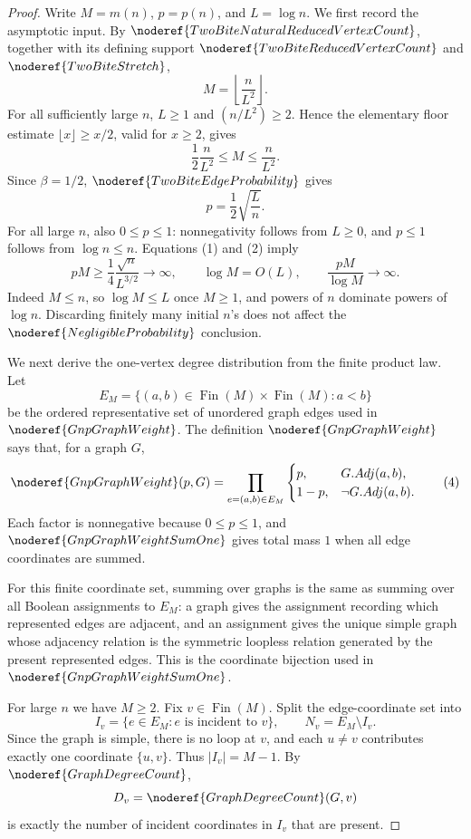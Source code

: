 \begin{proof}
Write \(M=m(n)\), \(p=p(n)\), and \(L=\log n\).  We first record the
asymptotic input.  By \(\noderef{TwoBiteNaturalReducedVertexCount}\),
together with its defining support \(\noderef{TwoBiteReducedVertexCount}\)
and \(\noderef{TwoBiteStretch}\),
\[
M=\left\lfloor \frac{n}{L^2}\right\rfloor .
\]
For all sufficiently large \(n\), \(L\ge1\) and
\((n/L^2)\ge2\).  Hence the elementary floor estimate
\(\lfloor x\rfloor\ge x/2\), valid for \(x\ge2\), gives
\[
\frac12\frac{n}{L^2}\le M\le \frac{n}{L^2}.
\tag{1}
\]
Since \(\beta=1/2\), \(\noderef{TwoBiteEdgeProbability}\) gives
\[
p=\frac12\sqrt{\frac{L}{n}}.
\tag{2}
\]
For all large \(n\), also \(0\le p\le1\): nonnegativity follows from
\(L\ge0\), and \(p\le1\) follows from \(\log n\le n\).  Equations (1) and
(2) imply
\[
pM\ge \frac14\frac{\sqrt n}{L^{3/2}}\to\infty,
\qquad
\log M=O(L),
\qquad
\frac{pM}{\log M}\to\infty .
\tag{3}
\]
Indeed \(M\le n\), so \(\log M\le L\) once \(M\ge1\), and powers of \(n\)
dominate powers of \(\log n\).  Discarding finitely many initial \(n\)'s
does not affect the \(\noderef{NegligibleProbability}\) conclusion.

We next derive the one-vertex degree distribution from the finite product
law.  Let
\[
E_M=\{(a,b)\in \operatorname{Fin}(M)\times\operatorname{Fin}(M):a<b\}
\]
be the ordered representative set of unordered graph edges used in
\(\noderef{GnpGraphWeight}\).  The definition
\(\noderef{GnpGraphWeight}\) says that, for a graph \(G\),
\[
\noderef{GnpGraphWeight}(p,G)
=\prod_{e=(a,b)\in E_M}
  \begin{cases}
  p,&G.Adj(a,b),\\
  1-p,&\neg G.Adj(a,b).
  \end{cases}
\tag{4}
\]
Each factor is nonnegative because \(0\le p\le1\), and
\(\noderef{GnpGraphWeightSumOne}\) gives total mass \(1\) when all edge
coordinates are summed.

For this finite coordinate set, summing over graphs is the same as summing
over all Boolean assignments to \(E_M\): a graph gives the assignment
recording which represented edges are adjacent, and an assignment gives the
unique simple graph whose adjacency relation is the symmetric loopless
relation generated by the present represented edges.  This is the coordinate
bijection used in \(\noderef{GnpGraphWeightSumOne}\).

For large \(n\) we have \(M\ge2\).  Fix \(v\in\operatorname{Fin}(M)\).
Split the edge-coordinate set into
\[
I_v=\{e\in E_M:e\text{ is incident to }v\},\qquad
N_v=E_M\setminus I_v .
\]
Since the graph is simple, there is no loop at \(v\), and each
\(u\ne v\) contributes exactly one coordinate \(\{u,v\}\).  Thus
\(|I_v|=M-1\).  By \(\noderef{GraphDegreeCount}\),
\[
D_v=\noderef{GraphDegreeCount}(G,v)
\]
is exactly the number of incident coordinates in \(I_v\) that are present.


\end{proof}
